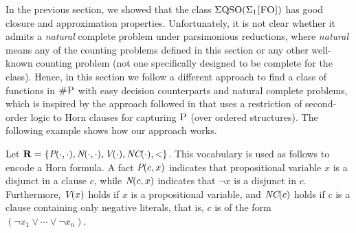 In the previous section, we showed that the class $\Sigma{\rm QSO}(\Sigma_{1}\textsc{[FO]})$ has good closure and approximation properties. Unfortunately, it is not clear whether it admits a {\em natural} complete problem under parsimonious reductions, where {\em natural} means any of the counting problems defined in this section or any other well-known counting problem (not one specifically designed to be complete for the class). Hence, in this section we follow a different approach to find a class of functions in $\text{\sc \#P}$ with easy decision counterparts and natural complete problems, which is inspired by the approach followed in \cite{G92} that uses a restriction of second-order logic to Horn clauses for capturing $\text{\sc P}$ (over ordered structures). The following example shows how our approach works.
\begin{exa} \label{ex-hornsat-esop1}
Let $\mathbf{R} = \{\textit{P}(\cdot,\cdot), \textit{N}(\cdot,\cdot), \textit{V}(\cdot), \textit{NC}(\cdot),<\}$. This vocabulary is used as follows to encode a Horn formula. A fact $\textit{P}(c,x)$ indicates that propositional variable $x$ is a disjunct in a clause $c$, while $\textit{N}(c,x)$ indicates that $\neg x$ is a disjunct in $c$. Furthermore, $\textit{V}(x)$ holds if  $x$ is a propositional variable, and $\textit{NC}(c)$ holds if $c$ is a clause containing only negative literals, that is, $c$ is of the form $(\neg x_1 \vee \cdots \vee \neg x_n)$.


\end{exa}
